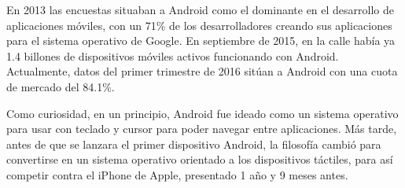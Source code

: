 \documentclass[
10pt, %
a4paper, %
oneside, %
headinclude,footinclude, %
BCOR5mm, %
]{scrartcl}
\begin{document}
En 2013 las encuestas situaban a Android como el dominante en el desarrollo de aplicaciones móviles, con un 71\% de los desarrolladores creando sus aplicaciones para el sistema operativo de Google. En septiembre de 2015, en la calle había ya 1.4 billones de dispositivos móviles activos funcionando con Android. Actualmente, datos del primer trimestre de 2016 sitúan a Android con una cuota de mercado del 84.1\%.

Como curiosidad, en un principio, Android fue ideado como un sistema operativo para usar con teclado y cursor para poder navegar entre aplicaciones. Más tarde, antes de que se lanzara el primer dispositivo Android, la filosofía cambió para convertirse en un sistema operativo orientado a los dispositivos táctiles, para así competir contra el iPhone de Apple, presentado 1 año y 9 meses antes.
\end{document}
